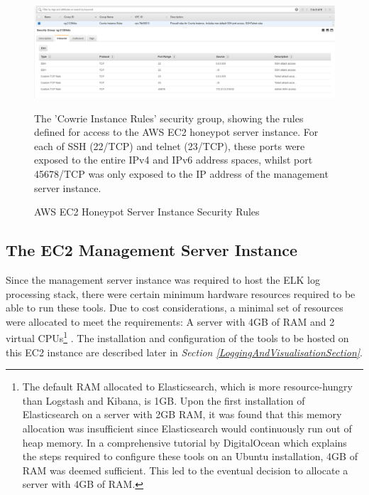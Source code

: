     \begin{figure}[ht]
      \centering
      \includegraphics[width=160mm, scale=1]{Images/AWS_honeypot_instance_security_group_rules.PNG}
      \caption{AWS EC2 Honeypot Server Instance Security Rules} 
      \medskip
	  \small
		The 'Cowrie Instance Rules' security group, showing the rules defined for access to the AWS EC2 honeypot server instance. For each of SSH (22/TCP) and telnet (23/TCP), these ports were exposed to the entire IPv4 and IPv6 address spaces, whilst port 45678/TCP was only exposed to the IP address of the management server instance.
\label{fig:HoneypotInstanceSecurityRules}
\end{figure}

	
    
\subsection{The EC2 Management Server Instance} \label{DeployingTheManagementInstance}
    
	Since the management server instance was required to host the ELK log processing stack, there were certain minimum hardware resources required to be able to run these tools. Due to cost considerations, a minimal set of resources were allocated to meet the requirements: A server with 4GB of RAM and 2 virtual CPUs\footnote{The default RAM allocated to Elasticsearch, which is more resource-hungry than Logstash and Kibana, is 1GB. \cite{ElasticsearchHeapSizing} Upon the first installation of Elasticsearch on a server with 2GB RAM, it was found that this memory allocation was insufficient since Elasticsearch would continuously run out of heap memory. In a comprehensive tutorial by DigitalOcean which explains the steps required to configure these tools on an Ubuntu installation, 4GB of RAM was deemed sufficient. \cite{DigitalOceanELKTutorial} This led to the eventual decision to allocate a server with 4GB of RAM.} . The installation and configuration of the tools to be hosted on this EC2 instance are described later in \textit{Section \ref{LoggingAndVisualisationSection}}.

